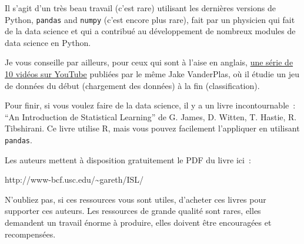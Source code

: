 Il s'agit d'un très beau travail (c'est rare) utilisant les dernières
versions de Python, \texttt{pandas} and \texttt{numpy} (c'est encore
plus rare), fait par un physicien qui fait de la data science et qui a
contribué au développement de nombreux modules de data science en
Python.

Je vous conseille par ailleurs, pour ceux qui sont à l'aise en anglais,
\href{https://www.youtube.com/watch?v=_ZEWDGpM-vM}{une série de 10
vidéos sur YouTube} publiées par le même Jake VanderPlas, où il étudie
un jeu de données du début (chargement des données) à la fin
(classification).

    Pour finir, si vous voulez faire de la data science, il y a un livre
incontournable~: ``An Introduction de Statistical Learning'' de G.
James, D. Witten, T. Hastie, R. Tibshirani. Ce livre utilise R, mais
vous pouvez facilement l'appliquer en utilisant \texttt{pandas}.

Les auteurs mettent à disposition gratuitement le PDF du livre ici~:

http://www-bcf.usc.edu/\textasciitilde{}gareth/ISL/

    N'oubliez pas, si ces ressources vous sont utiles, d'acheter ces livres
pour supporter ces auteurs. Les ressources de grande qualité sont rares,
elles demandent un travail énorme à produire, elles doivent être
encouragées et recompensées.


    
    
    
